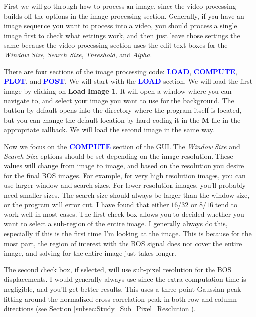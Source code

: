 \documentclass[letterpaper,12pt]{article}
\begin{document}
First we will go through how to process an image, since the video processing builds off the options in the image processing section.  Generally, if you have an image sequence you want to process into a video, you should process a single image first to check what settings work, and then just leave those settings the same because the video processing section uses the edit text boxes for the \textcolor{myBlue}{\textit{Window Size}}, \textcolor{myBlue}{\textit{Search Size}}, \textcolor{myBlue}{\textit{Threshold}}, and \textcolor{myBlue}{\textit{Alpha}}.

There are four sections of the image processing code: \textcolor{blue}{\textbf{LOAD}}, \textcolor{blue}{\textbf{COMPUTE}}, \textcolor{blue}{\textbf{PLOT}}, and \textcolor{blue}{\textbf{POST}}.  We will start with the \textcolor{blue}{\textbf{LOAD}} section.  We will load the first image by clicking on \textcolor{myBlue}{\textbf{Load Image 1}}.  It will open a window where you can navigate to, and select your image you want to use for the background.  The button by default opens into the directory where the program itself is located, but you can change the default location by hard-coding it in the \textbf{M} file in the appropriate callback.  We will load the second image in the same way.

Now we focus on the \textcolor{blue}{\textbf{COMPUTE}} section of the GUI.  The \textcolor{myBlue}{\textit{Window Size}} and \textcolor{myBlue}{\textit{Search Size}} options should be set depending on the image resolution.  These values will change from image to image, and based on the resolution you desire for the final BOS images.  For example, for very high resolution images, you can use larger window and search sizes.  For lower resolution images, you'll probably need smaller sizes.  The search size should always be larger than the window size, or the program will error out.  I have found that either $16$/$32$ or $8$/$16$ tend to work well in most cases.  The first check box allows you to decided whether you want to select a sub-region of the entire image.  I generally always do this, especially if this is the first time I'm looking at the image.  This is because for the most part, the region of interest with the BOS signal does not cover the entire image, and solving for the entire image just takes longer.

The second check box, if selected, will use sub-pixel resolution for the BOS displacements.  I would generally always use since the extra computation time is negligible, and you'll get better results.  This uses a three-point Gaussian peak fitting around the normalized cross-correlation peak in both row and column directions (see Section \ref{subsec:Study_Sub_Pixel_Resolution}).
\end{document}
